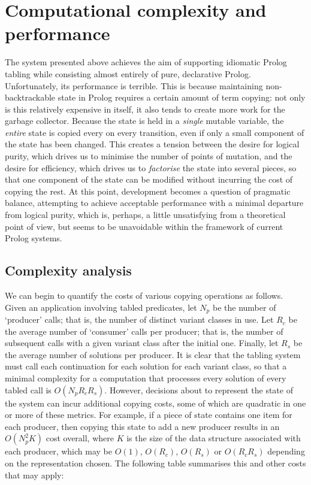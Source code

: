\section{Computational complexity and performance}

The system presented above achieves the aim of supporting
idiomatic Prolog tabling while consisting almost entirely of pure, declarative Prolog.
Unfortunately, its performance is terrible. This is because maintaining non-backtrackable
state in Prolog requires a certain amount of term copying: not only is this relatively
expensive in itself, it also tends to create more work for the garbage collector. 
Because the state is held in a \emph{single} mutable variable, the \emph{entire} state is
copied every on every transition, even if only a small component of the
state has been changed. This creates a tension between the desire for logical purity,
which drives us to minimise the number of points of mutation, and the desire for
efficiency, which drives us to \emph{factorise} the state into several
pieces, so that one component of the state can be modified without
incurring the cost of copying the rest. At this point, development becomes a 
question of pragmatic balance, attempting to achieve acceptable performance with
a minimal departure from logical purity, which is, perhaps, a little unsatisfying from a 
theoretical point of view, but seems to be unavoidable within the framework
of current Prolog systems. 

\subsection{Complexity analysis}

We can begin to quantify the costs of various copying operations as follows.
Given an application involving tabled predicates, let $N_p$ be the number
of `producer' calls; that is, the number of distinct variant classes in use.
Let $R_c$ be the average number of `consumer' calls per producer; that is, the
number of subsequent calls with a given variant class after the initial
one. Finally, let $R_s$ be the average number of solutions per producer.
It is clear that the tabling system must call each continuation for each solution
for each variant class, so that a minimal complexity for a computation that
processes every solution of every tabled call is $O(N_p R_c R_s)$. However,
decisions about to represent the state of the system can incur additional copying costs,
some of which are quadratic in one or more of these metrics. For example, if a piece of
state contains one item for each producer, then copying this state to add a new
producer results in an $O(N_p^2 K)$ cost overall, where $K$ is the size
of the data structure associated with each producer, which may be $O(1)$, $O(R_c)$,
$O(R_s)$ or $O(R_c R_s)$ depending on the representation chosen.
The following table summarises this and other costs that may apply:

